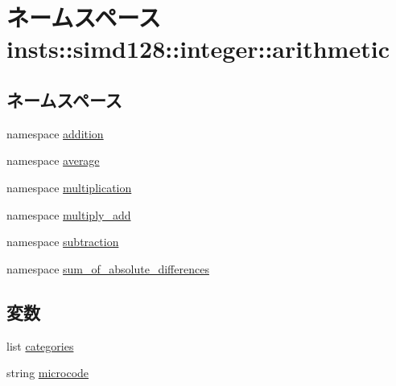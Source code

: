 \hypertarget{namespaceinsts_1_1simd128_1_1integer_1_1arithmetic}{
\section{ネームスペース insts::simd128::integer::arithmetic}
\label{namespaceinsts_1_1simd128_1_1integer_1_1arithmetic}
}
\subsection*{ネームスペース}
\begin{DoxyCompactItemize}
\item 
namespace \hyperlink{namespaceinsts_1_1simd128_1_1integer_1_1arithmetic_1_1addition}{addition}
\item 
namespace \hyperlink{namespaceinsts_1_1simd128_1_1integer_1_1arithmetic_1_1average}{average}
\item 
namespace \hyperlink{namespaceinsts_1_1simd128_1_1integer_1_1arithmetic_1_1multiplication}{multiplication}
\item 
namespace \hyperlink{namespaceinsts_1_1simd128_1_1integer_1_1arithmetic_1_1multiply__add}{multiply\_\-add}
\item 
namespace \hyperlink{namespaceinsts_1_1simd128_1_1integer_1_1arithmetic_1_1subtraction}{subtraction}
\item 
namespace \hyperlink{namespaceinsts_1_1simd128_1_1integer_1_1arithmetic_1_1sum__of__absolute__differences}{sum\_\-of\_\-absolute\_\-differences}
\end{DoxyCompactItemize}
\subsection*{変数}
\begin{DoxyCompactItemize}
\item 
list \hyperlink{namespaceinsts_1_1simd128_1_1integer_1_1arithmetic_a273cf0f1630af14c1582f05e53354a55}{categories}
\item 
string \hyperlink{namespaceinsts_1_1simd128_1_1integer_1_1arithmetic_a770f11a173e99389a8802f0107ed8f52}{microcode}
\end{DoxyCompactItemize}


